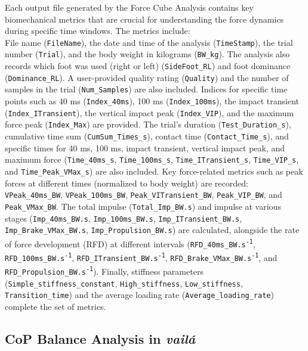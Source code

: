 \documentclass{article}
\begin{document}
Each output file generated by the Force Cube Analysis contains key biomechanical metrics that are crucial for understanding the force dynamics during specific time windows. The metrics include: \\ 
File name (\texttt{FileName}), the date and time of the analysis (\texttt{TimeStamp}), the trial number (\texttt{Trial}), and the body weight in kilograms (\texttt{BW\_kg}). The analysis also records which foot was used (right or left) (\texttt{SideFoot\_RL}) and foot dominance (\texttt{Dominance\_RL}). A user-provided quality rating (\texttt{Quality}) and the number of samples in the trial (\texttt{Num\_Samples}) are also included. Indices for specific time points such as 40 ms (\texttt{Index\_40ms}), 100 ms (\texttt{Index\_100ms}), the impact transient (\texttt{Index\_ITransient}), the vertical impact peak (\texttt{Index\_VIP}), and the maximum force peak (\texttt{Index\_Max}) are provided. The trial’s duration (\texttt{Test\_Duration\_s}), cumulative time sum (\texttt{CumSum\_Times\_s}), contact time (\texttt{Contact\_Time\_s}), and specific times for 40 ms, 100 ms, impact transient, vertical impact peak, and maximum force (\texttt{Time\_40ms\_s}, \texttt{Time\_100ms\_s}, \texttt{Time\_ITransient\_s}, \texttt{Time\_VIP\_s}, and \texttt{Time\_Peak\_VMax\_s}) are also included. Key force-related metrics such as peak forces at different times (normalized to body weight) are recorded: \texttt{VPeak\_40ms\_BW}, \texttt{VPeak\_100ms\_BW}, \texttt{Peak\_VITransient\_BW}, \texttt{Peak\_VIP\_BW}, and \texttt{Peak\_VMax\_BW}. The total impulse (\texttt{Total\_Imp\_BW.s}) and impulse at various stages (\texttt{Imp\_40ms\_BW.s}, \texttt{Imp\_100ms\_BW.s}, \texttt{Imp\_ITransient\_BW.s}, \texttt{Imp\_Brake\_VMax\_BW.s}, \texttt{Imp\_Propulsion\_BW.s}) are calculated, alongside the rate of force development (RFD) at different intervals (\texttt{RFD\_40ms\_BW.s\textsuperscript{-1}}, \texttt{RFD\_100ms\_BW.s\textsuperscript{-1}}, \texttt{RFD\_ITransient\_BW.s\textsuperscript{-1}}, \texttt{RFD\_Brake\_VMax\_BW.s\textsuperscript{-1}}, and \texttt{RFD\_Propulsion\_BW.s\textsuperscript{-1}}). Finally, stiffness parameters (\texttt{Simple\_stiffness\_constant}, \texttt{High\_stiffness}, \texttt{Low\_stiffness}, \texttt{Transition\_time}) and the average loading rate (\texttt{Average\_loading\_rate}) complete the set of metrics.


\subsection{CoP Balance Analysis in \textit{vailá}}
\end{document}
